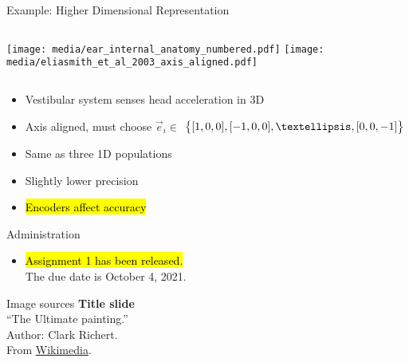 \documentclass[handout,aspectratio=169]{beamer}
\begin{document}
\begin{frame}{Example: Higher Dimensional Representation}
	\begin{columns}[b]
		\centering
		\texttt{[image: media/ear\_internal\_anatomy\_numbered.pdf]}
		\centering
		\texttt{[image: media/eliasmith\_et\_al\_2003\_axis\_aligned.pdf]}%
	\end{columns}
	\begin{multicols}{2}
		\begin{itemize}
			\item Vestibular system senses head acceleration in 3D
			\item Axis aligned, must choose $\vec e_i \in$
			$\big\{ [1, 0, 0], [-1, 0, 0], \textellipsis, [0, 0, -1] \big\}$
			\columnbreak
			\item Same as three 1D populations
			\item Slightly lower precision
			\item<2-> \hl{Encoders affect accuracy}
		\end{itemize}
	\end{multicols}
\end{frame}

\backupbegin

\begin{frame}{Administration}
	\begin{itemize}
		\setlength{\itemsep}{0.75cm}
		\item \hl{Assignment 1 has been released.}\\[0.25cm]
		The due date is October 4, 2021.
	\end{itemize}
\end{frame}

\begin{frame}[noframenumbering]{Image sources}
	\small
	\textbf{Title slide}\\\enquote{The Ultimate painting.}\\Author: Clark Richert.\\From \href{https://commons.wikimedia.org/wiki/File:\%22The_Ultimate_painting\%22.jpg}{Wikimedia}.
\end{frame}


\backupend
\end{document}
